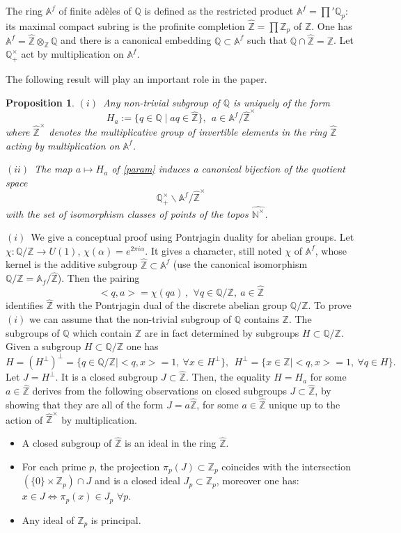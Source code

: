 \documentclass[noams,lp]{compositio}
\newtheorem{prop}[thm]{Proposition}
\def\A{{\mathbb A}}
\def\N{{\mathbb N}}
\def\Q{{\mathbb Q}}
\def\Z{{\mathbb Z}}
\def\qqq{\,,\,~\forall}
\def\wnt{{\widehat{\N^{\times}}}}
\def\hatz{{\hat\Z^\times}}
\begin{document}
The ring  $\A^f$ of finite ad\`eles of $\Q$ is defined as the restricted product $\A^f=\prod' \Q_p$: its maximal compact subring is the profinite completion $\hat\Z=\prod \Z_p$ of $\Z$.  One has $\A^f=\hat\Z\otimes_\Z\Q$ and there is a canonical embedding $\Q\subset \A^f$ such that $\Q\cap \hat \Z=\Z$. Let $\Q_+^\times$ act by multiplication on $\A^f$.

The following result will play an important role in the paper.

\begin{prop}\label{propsubgroup} $(i)$~Any non-trivial subgroup of $\Q$ is uniquely of the form
\begin{equation}\label{param}
H_a:=\{q\in \Q\mid aq\in \hat\Z\}, \  \ a\in \A^f/\hatz
\end{equation} 
where $\hatz$ denotes the multiplicative group of invertible elements in the ring $\hat \Z$ acting by multiplication on $\A^f$.

$(ii)$~The map $a\mapsto H_a$ of \eqref{param} induces a canonical bijection of  the quotient space
\begin{equation}\label{bc}
\Q_+^\times\backslash\A^f/\hatz
\end{equation}
  with the set of isomorphism classes of points of the topos $\wnt$.
\end{prop}
\proof $(i)$~We give a conceptual proof using Pontrjagin duality for abelian groups. \newline
 Let $\chi:\Q/\Z\to U(1)$, $\chi(\alpha)=e^{2\pi i \alpha}$. It  gives a character, still noted $\chi$ of $\A^f$, whose kernel is the additive subgroup $\hat\Z\subset \A^f$ (use the canonical isomorphism $\Q/\Z=\A_f/\hat \Z$). Then the  pairing 
$$
<q,a>=\chi(qa)\qqq q\in \Q/\Z, \  a\in \hat\Z
$$
 identifies $\hat\Z$ with the  Pontrjagin dual of the discrete abelian group $ \Q/\Z$. To prove $(i)$ we can assume that the non-trivial subgroup of $\Q$ contains $\Z$. The subgroups of $
\Q$ which contain $\Z$ are in fact determined by subgroups $H\subset \Q/\Z$. Given a subgroup $H\subset \Q/\Z$ one has
$$
H=(H^\perp)^\perp=\{q\in \Q/\Z\mid  <q,x>=1,\  \forall x\in H^\perp\}, \ \ H^\perp=\{x\in \hat\Z\mid <q,x>=1,\  \forall q\in H\}.
$$
Let $J=H^\perp$. It is a closed subgroup $J\subset \hat\Z$. Then, the equality $H=H_a$ for some $a\in \hat \Z$ derives from the following observations on closed subgroups $J\subset \hat\Z$, by showing that they are all of the form $J=a\hat\Z$, for some $a\in \hat \Z$ unique up to the action of $\hatz$ by multiplication.
\begin{itemize}
\item A closed subgroup of $\hat\Z$ is an ideal in the ring $\hat\Z$.
\item For each prime $p$, the projection $\pi_p(J)\subset \Z_p$ coincides with the intersection $(\{0\}\times \Z_p)\cap J$
and is a closed ideal $J_p\subset\Z_p$, moreover one  has: $x\in J\iff \pi_p(x)\in J_p$ $\forall p$.
\item Any ideal of $\Z_p$ is principal.
\end{itemize}
\end{document}
